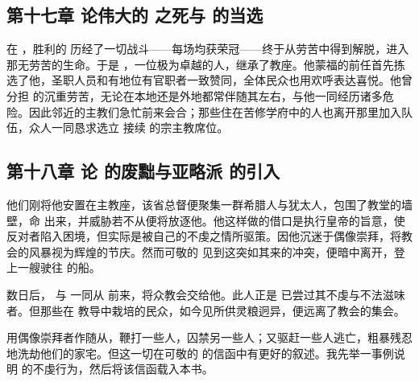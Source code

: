 
\subsection{第十七章  论伟大的  之死与  的当选}

在 ，胜利的  历经了一切战斗——每场均获荣冠——终于从劳苦中得到解脱，进入那无劳苦的生命。于是 ，一位极为卓越的人，继承了教座。他蒙福的前任首先拣选了他，圣职人员和有地位有官职者一致赞同，全体民众也用欢呼表达喜悦。他曾分担  的沉重劳苦，无论在本地还是外地都常伴随其左右，与他一同经历诸多危险。因此邻近的主教们急忙前来会合；那些住在苦修学府中的人也离开那里加入队伍，众人一同恳求选立  接续  的宗主教席位。\par


\subsection{第十八章  论  的废黜与亚略派  的引入}

他们刚将他安置在主教座，该省总督便聚集一群希腊人与犹太人，包围了教堂的墙壁，命  出来，并威胁若不从便将放逐他。他这样做的借口是执行皇帝的旨意，使反对者陷入困境，但实际是被自己的不虔之情所驱策。因他沉迷于偶像崇拜，将教会的风暴视为辉煌的节庆。然而可敬的  见到这突如其来的冲突，便暗中离开，登上一艘驶往  的船。\par

数日后， 与  一同从  前来，将众教会交给他。此人正是  已尝过其不虔与不法滋味者。但那些在  教导中栽培的民众，如今见所供灵粮迥异，便远离了教会的集会。\par

 用偶像崇拜者作随从，鞭打一些人，囚禁另一些人；又驱赶一些人逃亡，粗暴残忍地洗劫他们的家宅。但这一切在可敬的  的信函中有更好的叙述。我先举一事例说明  的不虔行为，然后将该信函载入本书。\par

